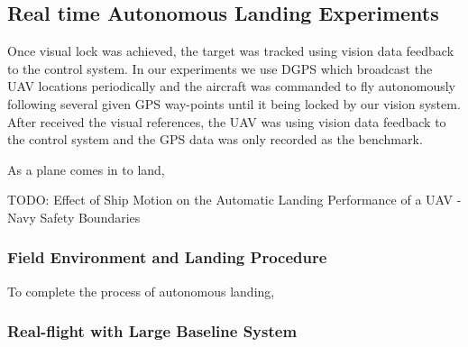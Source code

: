 \subsection{Real time Autonomous Landing Experiments}

Once visual lock was achieved, the target was tracked using vision data feedback to the control system.
%
In our experiments we use DGPS which broadcast the UAV locations periodically and the aircraft was commanded to fly autonomously following several given GPS way-points until it being locked by our vision system. After received the visual references, the UAV was using vision data feedback to the control system and the GPS data was only recorded as the benchmark.


As a plane comes in to land,

TODO:
Effect of Ship Motion on the Automatic Landing Performance of a UAV - Navy Safety Boundaries


\subsubsection{Field Environment and Landing Procedure}
To complete the process of autonomous landing,
 

\subsubsection{Real-flight with Large Baseline System}


